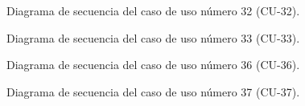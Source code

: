 \begin{figure}[htbp!]
	\begin{center}
		\caption{Diagrama de secuencia del caso de uso número 32 (CU-32).}
		\label{fig:Diagrama de secuencia CU-32}
	\end{center}
\end{figure}

\begin{figure}[htbp!]
	\begin{center}
		\caption{Diagrama de secuencia del caso de uso número 33 (CU-33).}
		\label{fig:Diagrama de secuencia CU-33}
	\end{center}
\end{figure}

\begin{figure}[htbp!]
	\begin{center}
		\caption{Diagrama de secuencia del caso de uso número 36 (CU-36).}
		\label{fig:Diagrama de secuencia CU-36}
	\end{center}
\end{figure}

\begin{figure}[htbp!]
	\begin{center}
		\caption{Diagrama de secuencia del caso de uso número 37 (CU-37).}
		\label{fig:Diagrama de secuencia CU-37}
	\end{center}
\end{figure}

